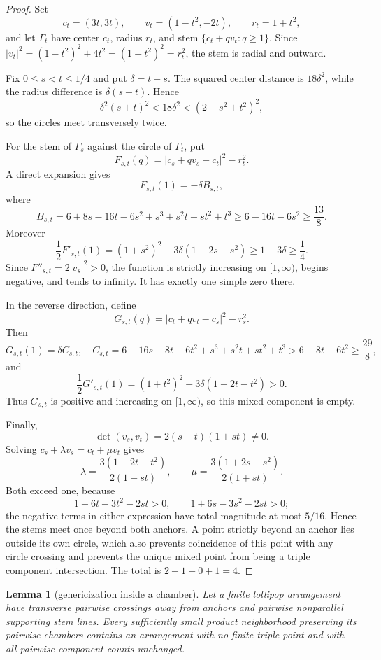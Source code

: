 \documentclass[11pt]{article}
\theoremstyle{plain}
\newtheorem{lemma}[theorem]{Lemma}
\theoremstyle{definition}
\theoremstyle{remark}
\newcommand{\1}{\mathbf 1}
\begin{document}
\begin{proof}
Set
\[
 c_t=(3t,3t),\qquad v_t=(1-t^2,-2t),\qquad r_t=1+t^2,
\]
and let $\Gamma_t$ have center $c_t$, radius $r_t$, and stem
$\{c_t+qv_t:q\geq1\}$.  Since
$|v_t|^2=(1-t^2)^2+4t^2=(1+t^2)^2=r_t^2$, the stem is radial and outward.

Fix $0\leq s<t\leq1/4$ and put $\delta=t-s$.  The squared center distance is
$18\delta^2$, while the radius difference is $\delta(s+t)$.  Hence
\[
 \delta^2(s+t)^2<18\delta^2<(2+s^2+t^2)^2,
\]
so the circles meet transversely twice.

For the stem of $\Gamma_s$ against the circle of $\Gamma_t$, put
\[
 F_{s,t}(q)=|c_s+qv_s-c_t|^2-r_t^2.
\]
A direct expansion gives
\[
 F_{s,t}(1)=-\delta B_{s,t},
\]
where
\[
 B_{s,t}=6+8s-16t-6s^2+s^3+s^2t+st^2+t^3
 \geq6-16t-6s^2\geq\frac{13}{8}.
\]
Moreover
\[
 \frac12F'_{s,t}(1)
 =(1+s^2)^2-3\delta(1-2s-s^2)
 \geq1-3\delta\geq\frac14.
\]
Since $F''_{s,t}=2|v_s|^2>0$, the function is strictly increasing on
$[1,\infty)$, begins negative, and tends to infinity.  It has exactly one
simple zero there.

In the reverse direction, define
\[
 G_{s,t}(q)=|c_t+qv_t-c_s|^2-r_s^2.
\]
Then
\[
 G_{s,t}(1)=\delta C_{s,t},
\quad
 C_{s,t}=6-16s+8t-6t^2+s^3+s^2t+st^2+t^3
 >6-8t-6t^2\geq\frac{29}{8},
\]
and
\[
 \frac12G'_{s,t}(1)
 =(1+t^2)^2+3\delta(1-2t-t^2)>0.
\]
Thus $G_{s,t}$ is positive and increasing on $[1,\infty)$, so this mixed
component is empty.

Finally,
\[
 \det(v_s,v_t)=2(s-t)(1+st)\ne0.
\]
Solving $c_s+\lambda v_s=c_t+\mu v_t$ gives
\[
 \lambda=\frac{3(1+2t-t^2)}{2(1+st)},\qquad
 \mu=\frac{3(1+2s-s^2)}{2(1+st)}.
\]
Both exceed one, because
\[
 1+6t-3t^2-2st>0,
 \qquad 1+6s-3s^2-2st>0;
\]
the negative terms in either expression have total magnitude at most
$5/16$.  Hence the stems meet once beyond both anchors.  A point strictly
beyond an anchor lies outside its own circle, which also prevents coincidence
of this point with any circle crossing and prevents the unique mixed point
from being a triple component intersection.  The total is
$2+1+0+1=4$.
\end{proof}

\begin{lemma}[genericization inside a chamber]\label{lem:genericize}
Let a finite lollipop arrangement have transverse pairwise crossings away from
anchors and pairwise nonparallel supporting stem lines.  Every sufficiently
small product neighborhood preserving its pairwise chambers contains an
arrangement with no finite triple point and with all pairwise component counts
unchanged.
\end{lemma}
\end{document}
